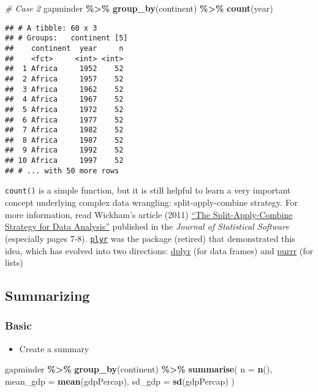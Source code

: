 \documentclass[
]{book}
\newenvironment{Shaded}{\begin{snugshade}}{\end{snugshade}}
\newcommand{\CommentTok}[1]{\textcolor[rgb]{0.56,0.35,0.01}{\textit{#1}}}
\newcommand{\DataTypeTok}[1]{\textcolor[rgb]{0.13,0.29,0.53}{#1}}
\newcommand{\KeywordTok}[1]{\textcolor[rgb]{0.13,0.29,0.53}{\textbf{#1}}}
\newcommand{\NormalTok}[1]{#1}
\newcommand{\OperatorTok}[1]{\textcolor[rgb]{0.81,0.36,0.00}{\textbf{#1}}}
\newcommand{\StringTok}[1]{\textcolor[rgb]{0.31,0.60,0.02}{#1}}
\providecommand{\tightlist}{%
  \setlength{\itemsep}{0pt}\setlength{\parskip}{0pt}}
\begin{document}
\begin{Shaded}
\begin{Highlighting}[]
\CommentTok{\# Case 2}
\NormalTok{gapminder }\OperatorTok{\%\textgreater{}\%}
\StringTok{  }\KeywordTok{group\_by}\NormalTok{(continent) }\OperatorTok{\%\textgreater{}\%}
\StringTok{  }\KeywordTok{count}\NormalTok{(year)}
\end{Highlighting}
\end{Shaded}

\begin{verbatim}
## # A tibble: 60 x 3
## # Groups:   continent [5]
##    continent  year     n
##    <fct>     <int> <int>
##  1 Africa     1952    52
##  2 Africa     1957    52
##  3 Africa     1962    52
##  4 Africa     1967    52
##  5 Africa     1972    52
##  6 Africa     1977    52
##  7 Africa     1982    52
##  8 Africa     1987    52
##  9 Africa     1992    52
## 10 Africa     1997    52
## # ... with 50 more rows
\end{verbatim}

\texttt{count()} is a simple function, but it is still helpful to learn a very important concept underlying complex data wrangling: split-apply-combine strategy. For more information, read Wickham's article (2011) \href{http://citeseerx.ist.psu.edu/viewdoc/download?doi=10.1.1.182.5667\&rep=rep1\&type=pdf}{``The Split-Apply-Combine Strategy for Data Analysis''} published in the \emph{Journal of Statistical Software} (especially pages 7-8). \href{https://github.com/hadley/plyr}{\texttt{plyr}} was the package (retired) that demonstrated this idea, which has evolved into two directions: \href{https://dplyr.tidyverse.org/}{dplyr} (for data frames) and \href{https://purrr.tidyverse.org/}{purrr} (for lists)

\hypertarget{summarizing}{%
\subsection{Summarizing}\label{summarizing}}

\hypertarget{basic}{%
\subsubsection{Basic}\label{basic}}

\begin{itemize}
\tightlist
\item
  Create a summary
\end{itemize}

\begin{Shaded}
\begin{Highlighting}[]
\NormalTok{gapminder }\OperatorTok{\%\textgreater{}\%}
\StringTok{  }\KeywordTok{group\_by}\NormalTok{(continent) }\OperatorTok{\%\textgreater{}\%}
\StringTok{  }\KeywordTok{summarise}\NormalTok{(}
    \DataTypeTok{n =} \KeywordTok{n}\NormalTok{(),}
    \DataTypeTok{mean\_gdp =} \KeywordTok{mean}\NormalTok{(gdpPercap),}
    \DataTypeTok{sd\_gdp =} \KeywordTok{sd}\NormalTok{(gdpPercap)}
\NormalTok{  )}
\end{Highlighting}
\end{Shaded}
\end{document}
